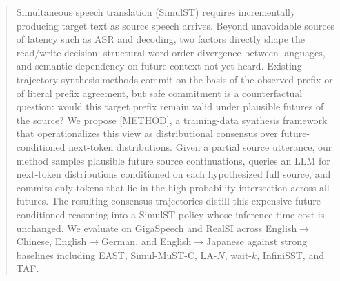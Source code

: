 \begin{abstract}
Simultaneous speech translation (SimulST) requires incrementally producing target text as source speech arrives. Beyond unavoidable sources of latency such as ASR and decoding, two factors directly shape the read/write decision: structural word-order divergence between languages, and semantic dependency on future context not yet heard. Existing trajectory-synthesis methods commit on the basis of the observed prefix or of literal prefix agreement, but safe commitment is a counterfactual question: would this target prefix remain valid under plausible futures of the source?
We propose [METHOD], a training-data synthesis framework that operationalizes this view as distributional consensus over future-conditioned next-token distributions. Given a partial source utterance, our method samples plausible future source continuations, queries an LLM for next-token distributions conditioned on each hypothesized full source, and commits only tokens that lie in the high-probability intersection across all futures. The resulting consensus trajectories distill this expensive future-conditioned reasoning into a SimulST policy whose inference-time cost is unchanged.
We evaluate on GigaSpeech and RealSI across English$\rightarrow$Chinese, English$\rightarrow$German, and English$\rightarrow$Japanese against strong baselines including EAST, Simul-MuST-C, LA-$N$, wait-$k$, InfiniSST, and TAF.
\end{abstract}